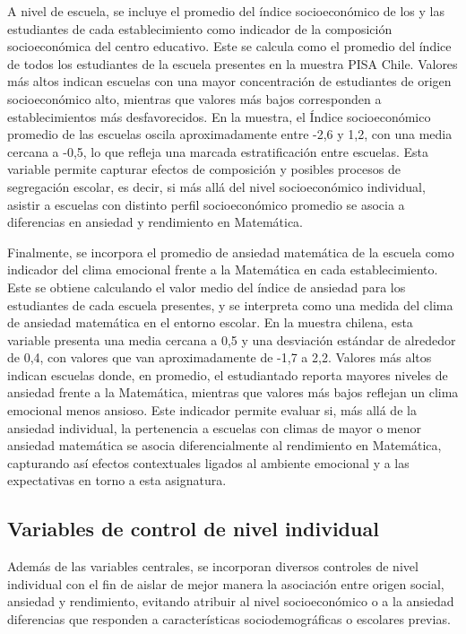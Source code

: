 \documentclass[
  spanish,
  a4paper,
  oneside]{scrbook}
\begin{document}
A nivel de escuela, se incluye el promedio del índice socioeconómico de
los y las estudiantes de cada establecimiento como indicador de la
composición socioeconómica del centro educativo. Este se calcula como el
promedio del índice de todos los estudiantes de la escuela presentes en
la muestra PISA Chile. Valores más altos indican escuelas con una mayor
concentración de estudiantes de origen socioeconómico alto, mientras que
valores más bajos corresponden a establecimientos más desfavorecidos. En
la muestra, el Índice socioeconómico promedio de las escuelas oscila
aproximadamente entre -2,6 y 1,2, con una media cercana a -0,5, lo que
refleja una marcada estratificación entre escuelas. Esta variable
permite capturar efectos de composición y posibles procesos de
segregación escolar, es decir, si más allá del nivel socioeconómico
individual, asistir a escuelas con distinto perfil socioeconómico
promedio se asocia a diferencias en ansiedad y rendimiento en
Matemática.

Finalmente, se incorpora el promedio de ansiedad matemática de la
escuela como indicador del clima emocional frente a la Matemática en
cada establecimiento. Este se obtiene calculando el valor medio del
índice de ansiedad para los estudiantes de cada escuela presentes, y se
interpreta como una medida del clima de ansiedad matemática en el
entorno escolar. En la muestra chilena, esta variable presenta una media
cercana a 0,5 y una desviación estándar de alrededor de 0,4, con valores
que van aproximadamente de -1,7 a 2,2. Valores más altos indican
escuelas donde, en promedio, el estudiantado reporta mayores niveles de
ansiedad frente a la Matemática, mientras que valores más bajos reflejan
un clima emocional menos ansioso. Este indicador permite evaluar si, más
allá de la ansiedad individual, la pertenencia a escuelas con climas de
mayor o menor ansiedad matemática se asocia diferencialmente al
rendimiento en Matemática, capturando así efectos contextuales ligados
al ambiente emocional y a las expectativas en torno a esta asignatura.

\subsection{Variables de control de nivel
individual}\label{variables-de-control-de-nivel-individual}

Además de las variables centrales, se incorporan diversos controles de
nivel individual con el fin de aislar de mejor manera la asociación
entre origen social, ansiedad y rendimiento, evitando atribuir al nivel
socioeconómico o a la ansiedad diferencias que responden a
características sociodemográficas o escolares previas.
\end{document}
